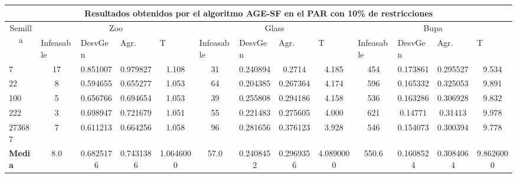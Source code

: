 \begin{table}[H]
\begin{adjustwidth}{-1cm}{-1cm}
	\begin{tabular}{|l|c|c|c|c|c|c|c|c|c|c|c|c|}
	\hline
	\multicolumn{13}{|c|}{\textbf{Resultados obtenidos por el algoritmo AGE-SF en el PAR con 10\% de restricciones}}                                                                                                                                                                                                                                                                                                                                            \\ \hline
	\multicolumn{1}{|c|}{\multirow{2}{*}{Semilla}} & \multicolumn{4}{c|}{Zoo}                                                                                          & \multicolumn{4}{c|}{Glass}                                                                                         & \multicolumn{4}{c|}{Bupa}                                                                                          \\ \cline{2-13} 
	\multicolumn{1}{|c|}{}                                  & \multicolumn{1}{l|}{Infeasable} & \multicolumn{1}{l|}{DesvGen} & \multicolumn{1}{l|}{Agr.} & \multicolumn{1}{l|}{T} & \multicolumn{1}{l|}{Infeasable} & \multicolumn{1}{l|}{DesvGen} & \multicolumn{1}{l|}{Agr.} & \multicolumn{1}{l|}{T} & \multicolumn{1}{l|}{Infeasable} & \multicolumn{1}{l|}{DesvGen} & \multicolumn{1}{l|}{Agr.} & \multicolumn{1}{l|}{T} \\ \hline
	7   	& 17 & 0.851007 & 0.979827 & 1.108 &				31 & 0.240894 & 0.2714 & 4.185 &			 	454 & 0.173861 & 0.295527 &  9.534		\\ \hline
	22 		& 8 & 0.594655 & 0.655277 &	1.053 &				64 & 0.204385 & 0.267364 &	4.174 &		 	596 & 0.165332 & 0.325053 &	9.891		\\ \hline
	100 	& 5 & 0.656766 & 0.694654 &	1.053 &				39 & 0.255808 & 0.294186 & 4.158 &				536 & 0.163286 & 0.306928 &	9.832		\\ \hline
	222 	& 3 & 0.698947 & 0.721679 &	1.051 &				55 & 0.221483 & 0.275605 &	4.000 & 			621 & 0.14771 & 0.31413 & 9.978			\\ \hline
	273687 	& 7 & 0.611213 & 0.664256 &	1.058 &				96 & 0.281656 & 0.376123 &	3.928 &			546 & 0.154073 & 0.300394 &	9.778		\\ \hline
	\textbf{Media} &  8.0 & 	0.6825176 & 	0.7431386 & 	1.0646000 & 	57.0 & 	0.2408452 & 	0.2969356 & 	4.0890000 & 	550.6 & 	0.1608524 & 	0.3084064 & 	9.8626000   \\ \hline
	\end{tabular}
	
	\end{adjustwidth}
	
\end{table}

